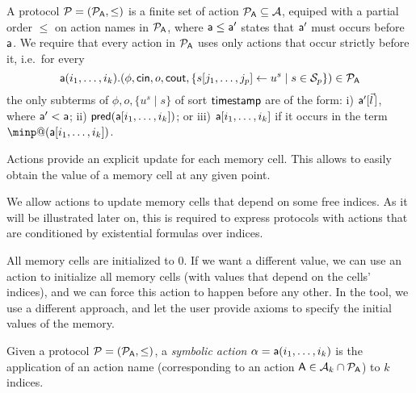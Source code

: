 \begin{definition} \label{def:proto}
  A protocol $\mathcal{P} = (\mathcal{P}_{\textsf{A}}, \leq)$ is a finite set of action $\mathcal{P}_{\textsf{A}} \subseteq \mathcal{A}$, equiped with a partial order $\leq$ on action names in $\mathcal{P}_{\textsf{A}}$, where $\textsf{a} \leq \textsf{a}'$ states that $\textsf{a}'$ must occurs before $\textsf{a}$. %
  We require that every action in $\mathcal{P}_{\textsf{A}}$ uses only actions that occur strictly before it, i.e.\ for every
  \[
    \textsf{a}(i_1,\dots,i_k).(\phi, \mathsf{cin}, o, \mathsf{cout},
    \{s[j_1,\dots, j_p] \leftarrow u^{s} \mid s \in \mathcal{S}_{p}\})
    \in \mathcal{P}_{\textsf{A}}
  \]
  the only subterms of $\phi, o, \{u^{s}\mid s\}$ of sort $\textsf{timestamp}$ are of the form: i) $\sfa'[\pvec{l}]$, where $\textsf{a}' < \textsf{a}$; ii) $\textsf{pred}(\textsf{a}[i_1,\dots,i_k])$; or iii) $\textsf{a}[i_1,\dots,i_k]$ if it occurs in the term $\minp@(\sfa[i_1,\dots,i_k])$.
\end{definition}


\begin{remark}
  Actions provide an explicit update for each memory cell. This
  allows to easily obtain the value of a memory cell at any given point.

  We allow actions to update memory cells that depend on some free indices.  As
  it will be illustrated later on, this is required to express protocols with
  actions that are conditioned by existential formulas over indices.

  All memory cells are initialized to $0$. If we want a different value, we can use an action to initialize all memory cells (with values that depend on the cells'
  indices), and we can force this action to happen before any other.
  In the tool, we use a different approach, and let the user provide axioms to specify the initial values of the memory.
\end{remark}

\begin{definition}
  Given a protocol $\mathcal{P} = (\mathcal{P}_{\textsf{A}}, \leq)$, a \emph{symbolic action} $\alpha = \textsf{a}(i_1,\ldots,i_k)$ is the application of an action name (corresponding to an action $\textsf{A} \in \mathcal{A}_k \cap \mathcal{P}_{\textsf{A}}$) to $k$ indices.
\end{definition}

